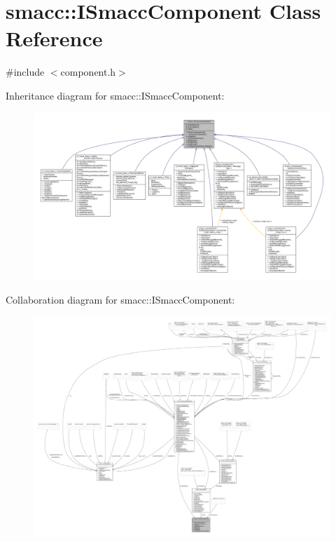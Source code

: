 \hypertarget{classsmacc_1_1ISmaccComponent}{}\section{smacc\+:\+:I\+Smacc\+Component Class Reference}
\label{classsmacc_1_1ISmaccComponent}


{\ttfamily \#include $<$component.\+h$>$}



Inheritance diagram for smacc\+:\+:I\+Smacc\+Component\+:
\nopagebreak
\begin{figure}[H]
\begin{center}
\leavevmode
\includegraphics[width=350pt]{classsmacc_1_1ISmaccComponent__inherit__graph}
\end{center}
\end{figure}


Collaboration diagram for smacc\+:\+:I\+Smacc\+Component\+:
\nopagebreak
\begin{figure}[H]
\begin{center}
\leavevmode
\includegraphics[width=350pt]{classsmacc_1_1ISmaccComponent__coll__graph}
\end{center}
\end{figure}
